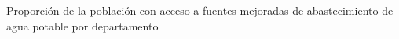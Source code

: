 Proporción de la población con acceso a fuentes mejoradas de abastecimiento de agua potable por departamento